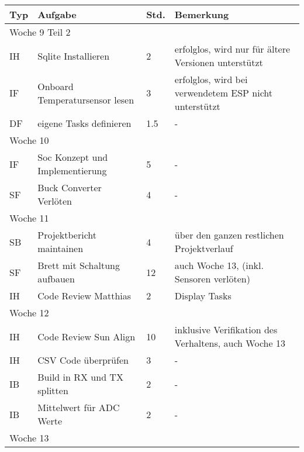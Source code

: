 \vspace{1em}
\begin{table}[!hp]
    \begin{center}
    \begin{tabular}{|p{0.8cm}|p{6cm}|p{0.8cm}|p{8cm}|} \hline
        \textbf{Typ} & \textbf{Aufgabe} & \textbf{Std.} & \textbf{Bemerkung} \\ \hline
        \multicolumn{4}{|l|}{Woche 9 Teil 2}                                                \\ \hline        
        IH & Sqlite Installieren                     & 2 & erfolglos, wird nur für ältere Versionen unterstützt \\
        IF & Onboard Temperatursensor lesen          & 3 & erfolglos, wird bei verwendetem ESP nicht unterstützt\\
        DF & eigene Tasks definieren                 & 1.5&- \\ \hline
        \multicolumn{4}{|l|}{Woche 10}                                                           \\ \hline
        IF & Soc Konzept und Implementierung         & 5 & -\\
        SF & Buck Converter Verlöten                 & 4 & -\\ \hline
        \multicolumn{4}{|l|}{Woche 11}                                                           \\ \hline
        SB & Projektbericht maintainen               & 4 & über den ganzen restlichen Projektverlauf \\
        SF & Brett mit Schaltung aufbauen            & 12 & auch Woche 13, (inkl. Sensoren verlöten) \\
        IH & Code Review Matthias                    & 2 & Display Tasks\\ \hline
        \multicolumn{4}{|l|}{Woche 12}                                                           \\ \hline
        IH & Code Review Sun Align                   & 10& inklusive Verifikation des Verhaltens, auch Woche 13\\
        IH & CSV Code überprüfen                     & 3 & - \\
        IB & Build in RX und TX splitten            & 2 & -\\
        IB & Mittelwert für ADC Werte               & 2 & -\\ \hline
        \multicolumn{4}{|l|}{Woche 13}                                                           \\ \hline

\end{tabular}
\end{center}
\end{table}
